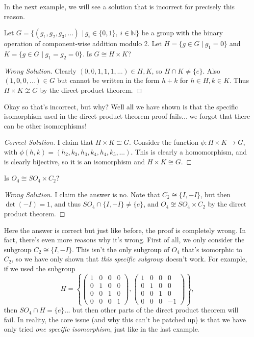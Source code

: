 \documentclass[11pt]{article}
\begin{document}
In the next example, we will see a solution that is incorrect for precisely this reason.

\begin{example}
	Let $G = \{(g_1, g_2, g_3, \dots) \mid g_i \in \{0, 1\},\  i \in \mathbb{N}\}$ be a group with the binary operation of component-wise addition modulo 2. Let $H = \{g \in G \mid g_1 = 0 \}$ and $K = \{g \in G \mid g_1 = g_2 = 0 \}$. Is $G \cong H \times K$?
\end{example}
\begin{proof}[{\color{Maroon}Wrong Solution}]
	Clearly $(0, 0, 1, 1, 1, \dots) \in H, K$, so $H \cap K \neq \{e \}$. Also $(1, 0, 0, \dots) \in G$ but cannot be written in the form $h+k$ for $h \in H, k \in K$. Thus $H \times K \not \cong G$ by the direct product theorem.
\end{proof}

Okay so that's incorrect, but why? Well all we have shown is that the specific isomorphism used in the direct product theorem proof fails... we forgot that there can be other isomorphisms! 

\begin{proof}[{\color{ForestGreen}Correct Solution}]
	I claim that $H \times K \cong G$. Consider the function $\phi: H \times K \rightarrow G$, with $\phi(h, k) = (h_2, k_3, h_3, k_4, h_4, k_5, \dots)$. This is clearly a homomorphism, and is clearly bijective, so it is an isomorphism and $H \times K \cong G$.
\end{proof}


\begin{example}
	Is $O_4 \cong SO_4 \times C_2$?
\end{example}
\begin{proof}[{\color{Maroon}Wrong Solution}]
	I claim the answer is no. Note that $C_2 \cong \{I , -I \}$, but then $\det(-I) = 1$, and thus $SO_4 \cap \{I , -I \} \neq \{e\}$, and $O_4 \not \cong SO_4 \times C_2$ by the direct product theorem.
\end{proof}

Here the answer is correct but just like before, the proof is completely wrong. In fact, there's even more reasons why it's wrong. First of all, we only consider the subgroup $C_2 \cong \{I, -I \}$. This isn't the only subgroup of $O_4$ that's isomorphic to $C_2$, so we have only shown that \emph{this specific subgroup} doesn't work. For example, if we used the subgroup
$$
H =  \left \{ \begin{pmatrix}
	1 & 0 & 0 & 0 \\
	0 & 1 & 0 & 0 \\
	0 & 0 & 1 & 0 \\
	0 & 0 & 0 & 1
\end{pmatrix}, \begin{pmatrix}
	1 & 0 & 0 & 0 \\
	0 & 1 & 0 & 0 \\
	0 & 0 & 1 & 0 \\
	0 & 0 & 0 & -1
\end{pmatrix}\right\},$$
then $SO_4 \cap H = \{e\}$... but then other parts of the direct product theorem will fail. In reality, the core issue (and why this can't be patched up) is that we have only tried \emph{one specific isomorphism}, just like in the last example.
\end{document}

